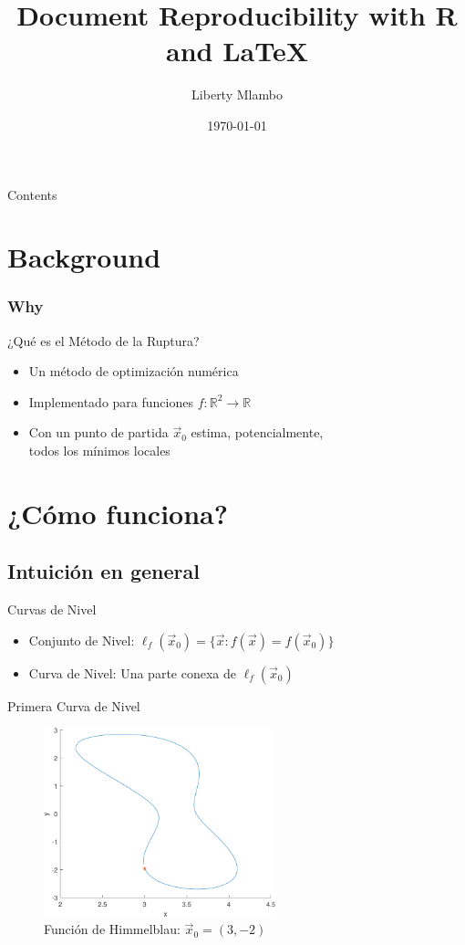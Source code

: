 \documentclass[fleqn]{beamer}\usepackage[]{graphicx}\usepackage[]{xcolor}
\title{Document Reproducibility with R and \LaTeX}
\author{Liberty Mlambo}
\institute[University of Nottingham (MAPS Project)]{ Research Assistant:\\ Micronutrient Action Policy Support Project (MAPS) }
\date{\today}
\begin{document}
\begin{frame}
  \titlepage
\end{frame}

\begin{frame}{Contents}
    \tableofcontents
\end{frame}

\section{Background}
\begin{frame}
  \frametitle{Why}
    ¿Qué es el Método de la Ruptura?
    \begin{itemize}[<+->]
      \item Un método de optimización numérica
      \item Implementado para funciones $f:\mathbb{R}^2\rightarrow \mathbb{R}$
      \item Con un punto de partida $\vec{x}_0$ estima, potencialmente, \\todos los mínimos locales
    \end{itemize}
\end{frame}

\section{¿Cómo funciona?}
\subsection{Intuición en general}
\begin{frame}{Curvas de Nivel}
    \begin{itemize}
        \item Conjunto de Nivel: $\ell_{f}(\vec{x}_0)= \{\vec{x}: f(\vec{x}) = f(\vec{x}_0) \}$
        \item Curva de Nivel: Una parte conexa de $\ell_f(\vec{x}_0)$
    \end{itemize}
\end{frame}

\begin{frame}{Primera Curva de Nivel}
    \begin{figure}
        \centering
        \includegraphics[width = 0.6\textwidth]{Hourglass-cropped.pdf}
        \caption{Función de Himmelblau: $\vec{x}_0 = (3,-2)$}
        \label{fig:my_label}
    \end{figure}
\end{frame}
\end{document}
